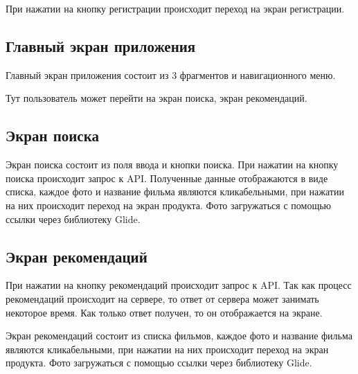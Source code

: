 При нажатии на кнопку регистрации происходит переход на экран регистрации.

\subsection{Главный экран приложения}

Главный экран приложения состоит из 3 фрагментов и навигационного меню.


Тут пользователь может перейти на экран поиска, экран рекомендаций.

\subsection{Экран поиска}

Экран поиска состоит из поля ввода и кнопки поиска.
При нажатии на кнопку поиска происходит запрос к API.
Полученные данные отображаются в виде списка, каждое фото и название фильма являются кликабельными, при нажатии на них
происходит переход на экран продукта.
Фото загружаться с помощью ссылки через библиотеку Glide.

\subsection{Экран рекомендаций}

При нажатии на кнопку рекомендаций происходит запрос к API.
Так как процесс рекомендаций происходит на сервере, то ответ от сервера может занимать некоторое время.
Как только ответ получен, то он отображается на экране.

Экран рекомендаций состоит из списка фильмов, каждое фото и название фильма являются кликабельными, при нажатии на них
происходит переход на экран продукта.
Фото загружаться с помощью ссылки через библиотеку Glide.